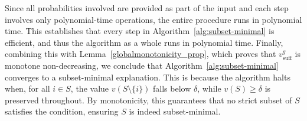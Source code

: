 \documentclass{article}
\newcommand{\z}{\textbf{z}}
\newcommand{\x}{\textbf{x}}
\begin{document}
Since all probabilities involved are provided as part of the input and each step involves only polynomial-time operations, the entire procedure runs in polynomial time. This establishes that every step in Algorithm~\ref{alg:subset-minimal} is efficient, and thus the algorithm as a whole runs in polynomial time. Finally, combining this with Lemma~\ref{globalmonotonicity_prop}, which proves that $v^g_{\text{suff}}$ is monotone non-decreasing, we conclude that Algorithm~\ref{alg:subset-minimal} converges to a subset-minimal explanation. This is because the algorithm halts when, for all $i \in S$, the value $v(S \setminus \{i\})$ falls below $\delta$, while $v(S) \geq \delta$ is preserved throughout. By monotonicity, this guarantees that no strict subset of $S$ satisfies the condition, ensuring $S$ is indeed subset-minimal.

\end{document}
